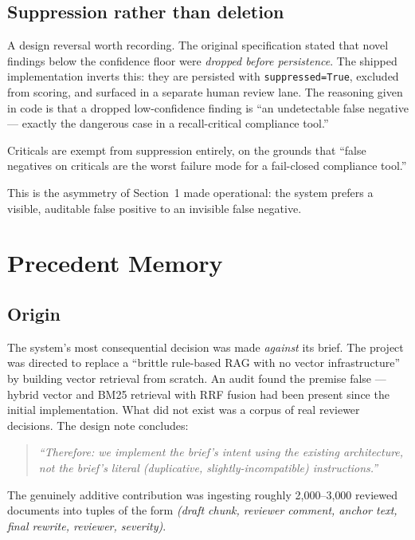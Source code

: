 \documentclass[10pt]{article}
\newcommand{\code}[1]{\texttt{\small #1}}
\begin{document}
\subsection{Suppression rather than deletion}

A design reversal worth recording. The original specification stated that novel
findings below the confidence floor were \emph{dropped before persistence}. The
shipped implementation inverts this: they are persisted with
\code{suppressed=True}, excluded from scoring, and surfaced in a separate human
review lane. The reasoning given in code is that a dropped low-confidence
finding is ``an undetectable false negative --- exactly the dangerous case in a
recall-critical compliance tool.''

Criticals are exempt from suppression entirely, on the grounds that ``false
negatives on criticals are the worst failure mode for a fail-closed compliance
tool.''

This is the asymmetry of Section~1 made operational: the system prefers a
visible, auditable false positive to an invisible false negative.

\section{Precedent Memory}
\label{sec:precedent}

\subsection{Origin}

The system's most consequential decision was made \emph{against} its brief. The
project was directed to replace a ``brittle rule-based RAG with no vector
infrastructure'' by building vector retrieval from scratch. An audit found the
premise false --- hybrid vector and BM25 retrieval with RRF fusion had been
present since the initial implementation. What did not exist was a corpus of
real reviewer decisions. The design note concludes:

\begin{quote}\itshape
``Therefore: we implement the brief's \emph{intent} using the \emph{existing}
architecture, not the brief's literal (duplicative, slightly-incompatible)
instructions.''
\end{quote}

The genuinely additive contribution was ingesting roughly 2{,}000--3{,}000
reviewed documents into tuples of the form \emph{(draft chunk, reviewer
comment, anchor text, final rewrite, reviewer, severity)}.
\end{document}
